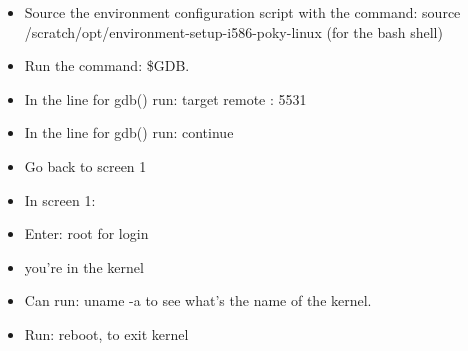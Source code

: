\documentclass{article}
\begin{document}
\begin{itemize}
\begin{itemize}
\begin{itemize}
\item Source the environment configuration script with the command: source /scratch/opt/environment-setup-i586-poky-linux (for the bash shell)
\item Run the command: \$GDB.
\item In the line for gdb() run: target remote : 5531
\item In the line for gdb() run: continue
\item Go back to screen 1
\item In screen 1: 
\item Enter:  root for login
\item you’re in the kernel
\item Can run: uname -a to see what’s the name of the kernel.
\item Run: reboot, to exit kernel
\end{itemize}
\end{itemize}


\end{itemize}
\end{document}
